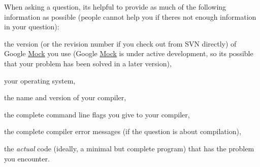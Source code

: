 When asking a question, it\textquotesingle{}s helpful to provide as much of the following information as possible (people cannot help you if there\textquotesingle{}s not enough information in your question)\+:


\begin{DoxyItemize}
\item the version (or the revision number if you check out from S\+VN directly) of Google \mbox{\hyperlink{class_mock}{Mock}} you use (Google \mbox{\hyperlink{class_mock}{Mock}} is under active development, so it\textquotesingle{}s possible that your problem has been solved in a later version),
\item your operating system,
\item the name and version of your compiler,
\item the complete command line flags you give to your compiler,
\item the complete compiler error messages (if the question is about compilation),
\item the {\itshape actual} code (ideally, a minimal but complete program) that has the problem you encounter. 
\end{DoxyItemize}